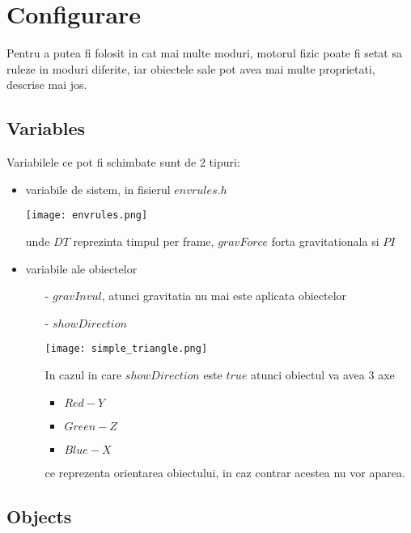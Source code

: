 \chapter{Configurare}

Pentru a putea fi folosit in cat mai multe moduri, motorul fizic poate fi setat sa ruleze in moduri diferite, iar obiectele sale pot avea mai multe proprietati, descrise mai jos.

\section{Variables}

Variabilele ce pot fi schimbate sunt de 2 tipuri:
\begin{itemize}
    \item variabile de sistem, in fisierul $envrules.h$
    \begin{center}
        \texttt{[image: envrules.png]}
    \end{center}
    unde $DT$ reprezinta timpul per frame, $gravForce$ forta gravitationala si $PI$
    \item variabile ale obiectelor
    \begin{itemize}
        \item[-] $gravInvul$, atunci gravitatia nu mai este aplicata obiectelor
        \item[-] $showDirection$
        \begin{center}
        \texttt{[image: simple\_triangle.png]}
        \end{center}
        In cazul in care $showDirection$ este $true$ atunci obiectul va avea 3 axe 
        \begin{itemize}
            \item $Red-Y$
            \item $Green-Z$
            \item $Blue-X$
        \end{itemize} ce reprezenta orientarea obiectului, in caz contrar acestea nu vor aparea.
    \end{itemize}
\end{itemize}


\section{Objects}

